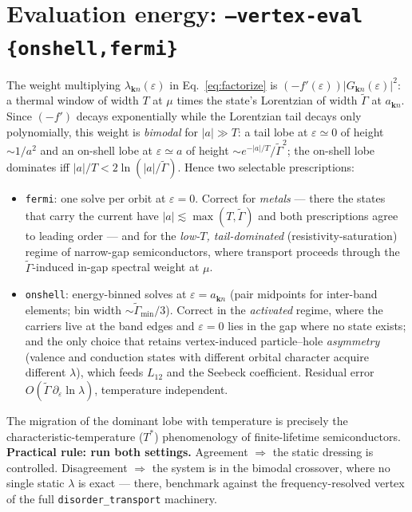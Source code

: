 \documentclass[11pt]{article}
\newcommand{\vk}{\mathbf{k}}
\newcommand{\eps}{\varepsilon}
\newcommand{\Gam}{\Gamma}
\begin{document}
\section{Evaluation energy: \texttt{--vertex-eval \{onshell,fermi\}}}
\label{sec:eval}
The weight multiplying $\lambda_{\vk n}(\eps)$ in
Eq.~\eqref{eq:factorize} is $(-f'(\eps))|G_{\vk n}(\eps)|^2$: a thermal
window of width $T$ at $\mu$ times the state's Lorentzian of width
$\tilde\Gam$ at $a_{\vk n}$.  Since $(-f')$ decays exponentially while
the Lorentzian tail decays only polynomially, this weight is
\emph{bimodal} for $|a|\gg T$: a tail lobe at $\eps\simeq0$ of height
$\sim1/a^{2}$ and an on-shell lobe at $\eps\simeq a$ of height
$\sim e^{-|a|/T}/\tilde\Gam^{2}$; the on-shell lobe dominates iff
$|a|/T<2\ln(|a|/\tilde\Gam)$.  Hence two selectable prescriptions:
\begin{itemize}
\item \texttt{fermi}: one solve per orbit at $\eps=0$.  Correct for
\emph{metals} --- there the states that carry the current have
$|a|\lesssim\max(T,\tilde\Gam)$ and both prescriptions agree to leading
order --- and for the \emph{low-$T$, tail-dominated}
(resistivity-saturation) regime of narrow-gap semiconductors, where
transport proceeds through the $\tilde\Gam$-induced in-gap spectral
weight at $\mu$.
\item \texttt{onshell}: energy-binned solves at $\eps=a_{\vk n}$ (pair
midpoints for inter-band elements; bin width
$\sim\tilde\Gam_{\min}/3$).  Correct in the \emph{activated} regime,
where the carriers live at the band edges and $\eps=0$ lies in the gap
where no state exists; and the only choice that retains vertex-induced
particle--hole \emph{asymmetry} (valence and conduction states with
different orbital character acquire different $\lambda$), which feeds
$L_{12}$ and the Seebeck coefficient.  Residual error
$O(\tilde\Gam\,\partial_\eps\ln\lambda)$, temperature independent.
\end{itemize}
The migration of the dominant lobe with temperature is precisely the
characteristic-temperature ($T^\ast$) phenomenology of finite-lifetime
semiconductors.  \textbf{Practical rule: run both settings.}  Agreement
$\Rightarrow$ the static dressing is controlled.  Disagreement
$\Rightarrow$ the system is in the bimodal crossover, where no single
static $\lambda$ is exact --- there, benchmark against the
frequency-resolved vertex of the full \texttt{disorder\_transport}
machinery.
\end{document}
